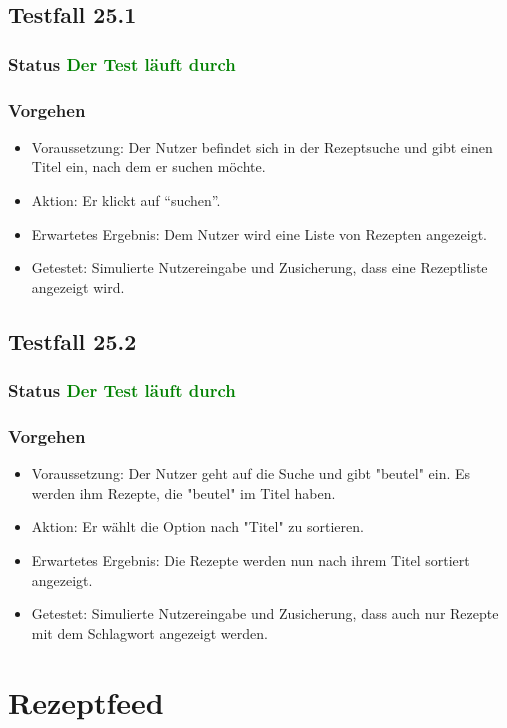 \subsection{Testfall 25.1}
\subsubsection{Status \textcolor{green}{ Der Test läuft durch} }
\subsubsection{Vorgehen}
\begin{itemize}
\item Voraussetzung: Der Nutzer befindet sich in der Rezeptsuche und gibt einen Titel ein, nach dem er suchen möchte.
\item Aktion: Er klickt auf "`suchen"'.
\item Erwartetes Ergebnis: Dem Nutzer wird eine Liste von Rezepten angezeigt.
\item Getestet: Simulierte Nutzereingabe und Zusicherung, dass eine Rezeptliste angezeigt wird.
\end{itemize}

\subsection{Testfall 25.2}
\subsubsection{Status \textcolor{green}{ Der Test läuft durch} }
\subsubsection{Vorgehen}
\begin{itemize}
\item Voraussetzung: Der Nutzer geht auf die Suche und gibt "beutel" ein. Es werden ihm Rezepte, die "beutel" im Titel haben.
\item Aktion: Er wählt die Option nach "Titel" zu sortieren.
\item Erwartetes Ergebnis: Die Rezepte werden nun nach ihrem Titel sortiert angezeigt. 
\item Getestet: Simulierte Nutzereingabe und Zusicherung, dass auch nur Rezepte mit dem Schlagwort angezeigt werden.
\end{itemize}

\section{Rezeptfeed}


